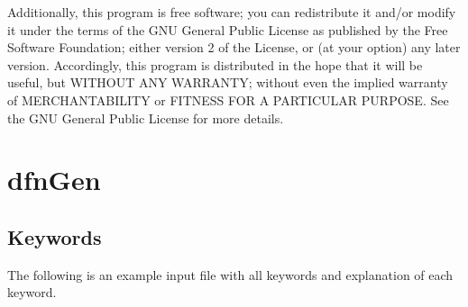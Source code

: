 \documentclass[letterpaper,10pt,english]{sphinxmanual}
\begin{document}
Additionally, this program is free software; you can redistribute it and/or
modify it under the terms of the GNU General Public License as published by
the Free Software Foundation; either version 2 of the License, or (at your
option) any later version. Accordingly, this program is distributed in the
hope that it will be useful, but WITHOUT ANY WARRANTY; without even the
implied warranty of MERCHANTABILITY or FITNESS FOR A PARTICULAR PURPOSE.
See the GNU General Public License for more details.


\chapter{dfnGen}
\label{dfngen:dfngen-chapter}\label{dfngen:dfngen}\label{dfngen::doc}

\section{Keywords}
\label{dfngen:keywords}
The following is an example input file with all keywords and explanation of each keyword.
\end{document}
